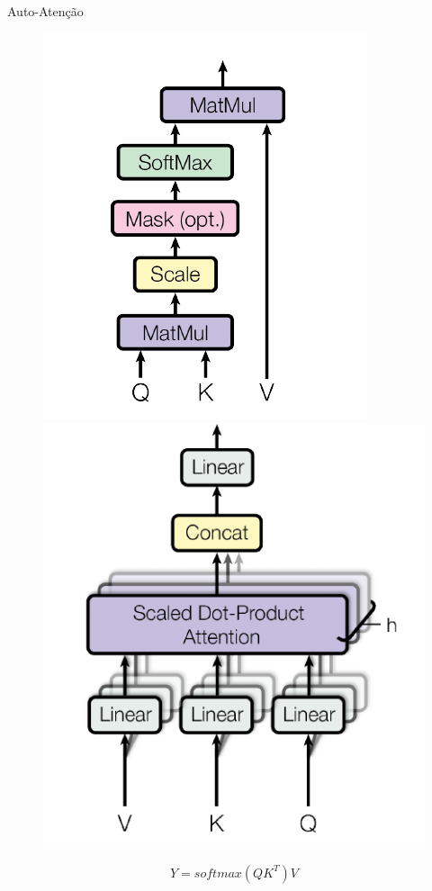 \documentclass[8pt]{beamer}
\begin{document}
\begin{frame}{Auto-Atenção}

    \begin{figure}[!ht]
        \centering
        \includegraphics[width=0.3\columnwidth]{
            Imagens/Scaled Dot-Product Attention.png
        }
        \includegraphics[width=0.3\columnwidth]{
            Imagens/Multi-Head Attention.png
        }

        \begin{equation}
            Y = softmax(QK^T)V
        \end{equation}
        \caption{\cite{dosovitskiy2020image}}
        \label{fig:vit}
    \end{figure}
\end{frame}
\end{document}

